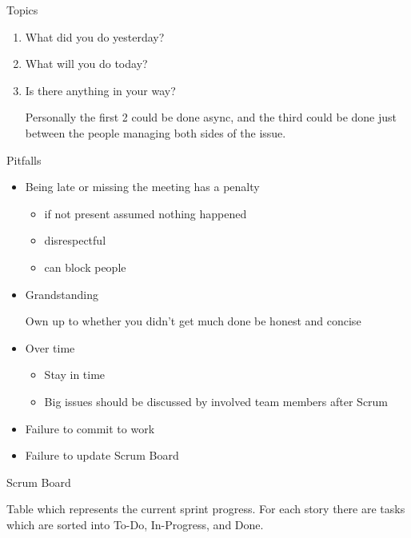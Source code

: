 \documentclass{report}
\begin{document}
\begin{description}
        Topics
        \begin{enumerate}
            \item What did you do yesterday?
            \item What will you do today?
            \item Is there anything in your way?
                \begin{mdframed}
                    Personally the first 2 could be
                    done async, and the third could be
                    done just between the people managing
                    both sides of the issue.
                \end{mdframed}
        \end{enumerate}

    \item Pitfalls
        \begin{itemize}
            \item Being late or missing the meeting has a penalty
                \begin{itemize}
                    \item if not present assumed nothing happened
                    \item disrespectful
                    \item can block people
                \end{itemize}
            \item Grandstanding

                Own up to whether you didn't get much done
                be honest and concise

            \item Over time
                \begin{itemize}
                    \item Stay in time
                    \item Big issues should be discussed
                        by involved team members after Scrum
                \end{itemize}
            \item Failure to commit to work
            \item Failure to update Scrum Board
        \end{itemize}

    \item Scrum Board
        
        Table which represents the current sprint progress.
        For each story there are tasks which are sorted into
        To-Do, In-Progress, and Done.


\end{description}
\end{document}

